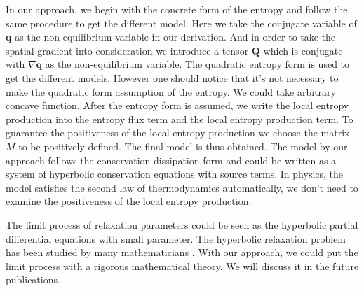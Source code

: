 \documentclass[a4paper]{article}
\begin{document}
In our approach, we begin with the concrete form of the entropy and follow the same procedure to get the different model. Here we take the conjugate variable of $\mathbf{q}$ as the non-equilibrium variable in our derivation. And in order to take the spatial gradient into consideration we introduce a tensor $\mathbf{Q}$ which is conjugate with $\nabla \mathbf{q}$ as the non-equilibrium variable. The quadratic entropy form is used to get the different models. However one should notice that it's not necessary to make the quadratic form assumption of the entropy. We could take arbitrary concave function. After the entropy form is assumed, we write the local entropy production into the entropy flux term and the local entropy production term. To guarantee the positiveness of the local entropy production we choose the matrix $M$ to be positively defined. The final model is thus obtained. The model by our approach follows the conservation-dissipation form and could be written as a system of hyperbolic conservation equations with source terms. In physics, the model satisfies the second law of thermodynamics automatically, we don't need to examine the positiveness of the local entropy production.

The limit process of relaxation parameters could be seen as the hyperbolic partial differential equations with small parameter. The hyperbolic relaxation problem has been studied by many mathematicians \cite{yong2001basic,chen1994hyperbolic}. With our approach, we could put the limit process with a rigorous mathematical theory. We will discuss it in the future publications.


{}

\end{document}
